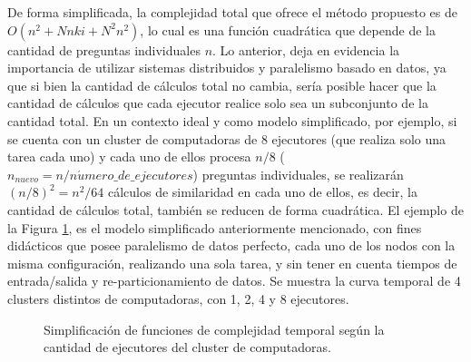 \bigskip De forma simplificada, la complejidad total que ofrece el método propuesto es de \(O(n^2 + Nnki + N^2n^2)\), lo cual es una función cuadrática que depende de la cantidad de preguntas individuales \(n\). Lo anterior, deja en evidencia la importancia de utilizar sistemas distribuidos y paralelismo basado en datos, ya que si bien la cantidad de cálculos total no cambia, sería posible hacer que la cantidad de cálculos que cada ejecutor realice solo sea un subconjunto de la cantidad total. En un contexto ideal y como modelo simplificado, por ejemplo, si se cuenta con un cluster de computadoras de \(8\) ejecutores (que realiza solo una tarea cada uno) y cada uno de ellos procesa \(n/8\) (\(n_{nuevo}=n / n\acute{u}mero\_de\_ejecutores\)) preguntas individuales, se realizarán \((n/8)^2=n^2/64\) cálculos de similaridad en cada uno de ellos, es decir, la cantidad de cálculos total, también se reducen de forma cuadrática. El ejemplo de la Figura \ref{fig:complejidad_temporal_figura}, es el modelo simplificado anteriormente mencionado, con fines didácticos que posee paralelismo de datos perfecto, cada uno de los nodos con la misma configuración, realizando una sola tarea, y sin tener en cuenta tiempos de entrada/salida y re-particionamiento de datos. Se muestra la curva temporal de 4 clusters distintos de computadoras, con 1, 2, 4 y 8 ejecutores.

\begin{figure}[h!]
	\centering
	\caption{Simplificación de funciones de complejidad temporal según la cantidad de ejecutores del cluster de computadoras.}
	\label{fig:complejidad_temporal_figura}
\end{figure}

